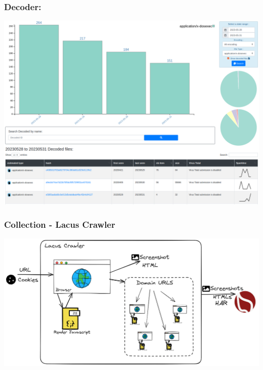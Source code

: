 \documentclass[aspectratio=169]{beamer}
\begin{document}
\begin{frame}
    \frametitle{Decoder:}
    \centerline{
        \includegraphics[scale=0.23]{screenshot/decodeds_dos.png}
    }
\end{frame}

\begin{frame}
    \frametitle{Collection - Lacus Crawler}
    \centerline{
        \includegraphics[scale=0.28]{images/ail-lacus.png}
    }
\end{frame}
\end{document}
